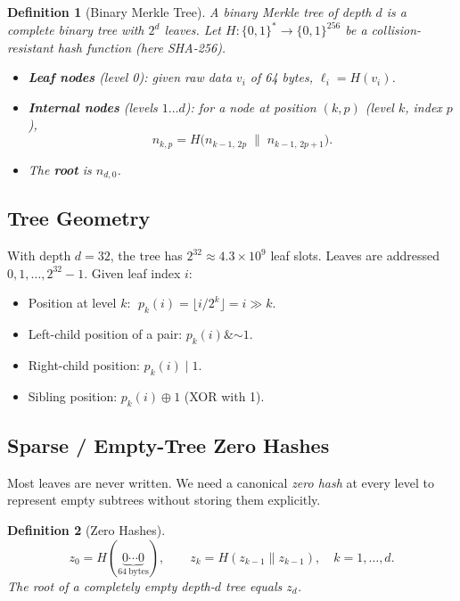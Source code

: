 \documentclass[12pt,a4paper]{article}
\newtheorem{definition}{Definition}
\begin{document}
\begin{definition}[Binary Merkle Tree]
A \emph{binary Merkle tree} of depth $d$ is a complete binary tree with
$2^d$ leaves.  Let $H : \{0,1\}^* \to \{0,1\}^{256}$ be a collision-resistant
hash function (here SHA-256).
\begin{itemize}
  \item \textbf{Leaf nodes} (level 0): given raw data $v_i$ of 64 bytes,
        $\ell_i = H(v_i)$.
  \item \textbf{Internal nodes} (levels $1 \ldots d$): for a node at position
        $(k, p)$ (level $k$, index $p$),
        \[
          n_{k,p} = H\!\bigl(n_{k-1,\,2p} \;\|\; n_{k-1,\,2p+1}\bigr).
        \]
  \item The \textbf{root} is $n_{d,0}$.
\end{itemize}
\end{definition}

\subsection{Tree Geometry}

With depth $d = 32$, the tree has $2^{32} \approx 4.3 \times 10^9$ leaf slots.
Leaves are addressed $0, 1, \ldots, 2^{32}-1$.  Given leaf index $i$:
\begin{itemize}
  \item Position at level $k$: $\; p_k(i) = \lfloor i / 2^k \rfloor = i \gg k$.
  \item Left-child position of a pair: $p_k(i) \mathbin{\&} \mathord{\sim}1$.
  \item Right-child position: $p_k(i) \mathbin{|} 1$.
  \item Sibling position: $p_k(i) \oplus 1$ (XOR with 1).
\end{itemize}

\subsection{Sparse / Empty-Tree Zero Hashes}

Most leaves are never written.  We need a canonical \emph{zero hash} at
every level to represent empty subtrees without storing them explicitly.

\begin{definition}[Zero Hashes]
\label{def:zerohash}
\[
  z_0 = H(\underbrace{0\cdots0}_{64\ \mathrm{bytes}}), \qquad
  z_k = H(z_{k-1} \| z_{k-1}), \quad k = 1, \ldots, d.
\]
The root of a completely empty depth-$d$ tree equals $z_d$.
\end{definition}
\end{document}

